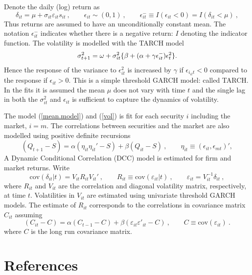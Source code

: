 \documentclass[authoryear]{elsarticle}
\newcommand{\cov}{\mathrm{cov}}
\newcommand{\eps}{\epsilon}
\newcommand{\ep}{\varepsilon}
\newcommand{\eref}[1]{(\ref{#1})}
\newcommand{\cq}{\ , \qquad}
\newcommand{\be}[1]{\begin{equation}\label{#1}}
\newcommand{\ee}{\end{equation}}
\begin{document}
Denote the daily (log) return as
\newcommand{\vareps}{\varepsilon}
\be{mean.model}
\delta_{it}=\mu+\sigma_{it}\ep_{it}s_{it}\cq \eps_{it}\sim (0,1)\cq  \eps^-_{it}\equiv I(\eps_{it}<0)=I(\delta_{it}<\mu)\ ,
\ee
Thus returns are assumed to have an unconditionally constant mean.   The notation $\eps_{it}^-$ indicates whether there is a negative return:  $I$ denoting the indicator function.  The volatility is modelled with the TARCH model
\be{vol}
\sigma_{t+1}^2 = \omega+ \sigma^2_{it}\{\beta+(\alpha+\gamma \eps^-_{it})\eps_{t}^2\}\\ .
\ee
Hence the response of the variance to $\eps_{it}^2$  is increased by $\gamma$   if $\eps_{i_{it}t}<0$ compared to the response if $\eps_{it}>0$.  This is a simple threshold GARCH model:  called TARCH.   In the fits it is assumed the mean $\mu$ does not vary with time $t$ and the single lag in both the $\sigma_{it}^2$ and $\eps_{it}$ is sufficient to capture the dynamics of volatility. 

The model \eref{mean.model} and \eref{vol} is fit  for each security $i$ including the market,  $i=m$.   The correlations between securities and the market are also modelled using  positive definite recursions   \citep{engle2002dynamic}
$$
(Q_{t+1}-S) = \alpha (\eta_{it}\eta_{it}'-S) + \beta (Q_{it}-S)\cq \eta_{it}\equiv(\eps_{it},\eps_{mt})' ,
$$
A   Dynamic Conditional Correlation (DCC) model is estimated for  firm and market returns.  Write
\newcommand{\veps}{\varepsilon}
$$
\cov (\delta_{it}|t) = V_{it}R_{it}V_{it}'\cq R_{it}\equiv \cov(\veps_{it}|t)\cq \veps_{it}=V_{it}^{-1}\delta_{it}\ ,
$$
where $R_{it}$ and  $V_{it}$  are the correlation and diagonal volatility matrix, respectively, at time $t$.   Volatilities in $V_{it}$  are estimated using univariate threshold GARCH models.  The estimate of $R_{it}$ corresponds to the correlations in covariance matrix $C_{it}$ assuming
$$
(C_{it} - C) = \alpha (C_{t-1}-C)+\beta (\veps_{it}\veps'_{it}-C) \cq C\equiv\cov(\veps_{it})\ .
$$
where $C$ is the long run covariance matrix.




\section*{References}

\end{document}
